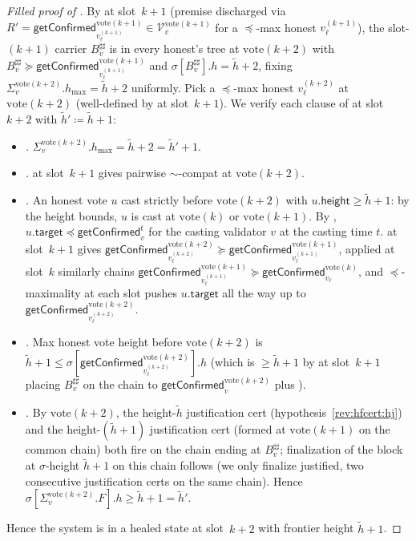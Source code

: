 \documentclass{article}
\newcommand{\V}[0]{\ensuremath{\mathcal{V}}}
\newcommand{\target}{\mathsf{target}}
\newcommand{\height}{\mathsf{height}}
\newcommand{\hmax}{\ensuremath{h_{\max}}\xspace}
\newcommand{\vote}{\ensuremath{\mathrm{vote}}}
\newcommand{\comm}[1]{\ensuremath{\widetilde{#1}}}
\newcommand{\getConfirmed}{\textsf{getConfirmed}\xspace}
\theoremstyle{plain}
\theoremstyle{definition}
\theoremstyle{remark}
\begin{document}
\begin{proof}[Filled proof of ]
By  at slot~$k+1$ (premise discharged via $R' = \getConfirmed_{v_\ell^{(k+1)}}^{\vote(k+1)} \in \V_v^{\vote(k+1)}$ for a $\preceq$-max honest $v_\ell^{(k+1)}$), the slot-$(k+1)$ carrier $B^{\sharp\sharp}_v$ is in every honest's tree at $\vote(k+2)$ with $B^{\sharp\sharp}_v \succeq \getConfirmed_{v_\ell^{(k+1)}}^{\vote(k+1)}$ and $\sigma[B^{\sharp\sharp}_v].h = \comm{h}+2$, fixing $\Sigma_v^{\vote(k+2)}.\hmax = \comm{h}+2$ uniformly.
Pick a $\preceq$-max honest $v_\ell^{(k+2)}$ at $\vote(k+2)$ (well-defined by  at slot~$k+1$).
We verify each clause of  at slot~$k+2$ with $\comm{h}' \coloneqq \comm{h}+1$:
\begin{itemize}
  \item \emph{.} $\Sigma_v^{\vote(k+2)}.\hmax = \comm{h}+2 = \comm{h}'+1$.
  \item \emph{.}  at slot~$k+1$ gives pairwise $\sim$-compat at $\vote(k+2)$.
  \item \emph{.} An honest vote $u$ cast strictly before $\vote(k+2)$ with $u.\height \geq \comm{h}+1$: by the height bounds, $u$ is cast at $\vote(k)$ or $\vote(k+1)$. By , $u.\target \preceq \getConfirmed_v^{t}$ for the casting validator $v$ at the casting time $t$.  at slot~$k+1$ gives $\getConfirmed_{v_\ell^{(k+2)}}^{\vote(k+2)} \succeq \getConfirmed_{v_\ell^{(k+1)}}^{\vote(k+1)}$, applied at slot~$k$ similarly chains $\getConfirmed_{v_\ell^{(k+1)}}^{\vote(k+1)} \succeq \getConfirmed_{v_\ell}^{\vote(k)}$, and $\preceq$-maximality at each slot pushes $u.\target$ all the way up to $\getConfirmed_{v_\ell^{(k+2)}}^{\vote(k+2)}$.
  \item \emph{.} Max honest vote height before $\vote(k+2)$ is $\comm{h}+1 \leq \sigma[\getConfirmed_{v_\ell^{(k+2)}}^{\vote(k+2)}].h$ (which is $\geq \comm{h}+1$ by  at slot~$k+1$ placing $B^{\sharp\sharp}_v$ on the chain to $\getConfirmed_v^{\vote(k+2)}$ plus ).
  \item \emph{.} By $\vote(k+2)$, the height-$\comm{h}$ justification cert (hypothesis~\ref{rev:hfcert:hj}) and the height-$(\comm{h}+1)$ justification cert (formed at $\vote(k+1)$ on the common chain) both fire on the chain ending at $B^{\sharp\sharp}_v$; finalization of the block at $\sigma$-height $\comm{h}+1$ on this chain follows (we only finalize justified, two consecutive justification certs on the same chain). Hence $\sigma[\Sigma_v^{\vote(k+2)}.F].h \geq \comm{h}+1 = \comm{h}'$.
\end{itemize}
Hence the system is in a healed state at slot~$k+2$ with frontier height $\comm{h}+1$.
\end{proof}
\end{document}
